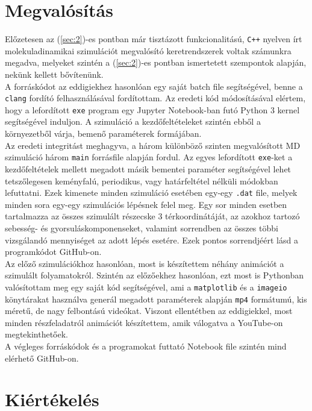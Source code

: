 \begin{multicols}{2}
\section{Megvalósítás} \label{sec:4}
Előzetesen az (\ref{sec:2})-es pontban már tisztázott funkcionalitású, \texttt{C++} nyelven írt molekuladinamikai szimulációt megvalósító keretrendszerek voltak számunkra megadva, melyeket szintén a (\ref{sec:2})-es pontban ismertetett szempontok alapján, nekünk kellett bővítenünk. \\
A forráskódot az eddigiekhez hasonlóan egy saját batch file segítségével, benne a \texttt{clang} fordító felhasználásával fordítottam. Az eredeti kód módosításával elértem, hogy a lefordított \texttt{exe} program egy Jupyter Notebook-ban futó Python 3 kernel segítségével induljon. A szimuláció a kezdőfeltételeket szintén ebből a környezetből várja, bemenő paraméterek formájában. \\
Az eredeti integritást meghagyva, a három különböző szinten megvalósított MD szimuláció három \texttt{main} forrásfile alapján fordul. Az egyes lefordított \texttt{exe}-ket a kezdőfeltételek mellett megadott másik bementei paraméter segítségével lehet tetszőlegesen keményfalú, periodikus, vagy határfeltétel nélküli módokban lefuttatni. Ezek kimenete minden szimuláció esetében egy-egy \texttt{.dat} file, melyek minden sora egy-egy szimulációs lépésnek felel meg. Egy sor minden esetben tartalmazza az összes szimulált részecske 3 térkoordinátáját, az azokhoz tartozó sebesség- és gyorsuláskomponenseket, valamint sorrendben az összes többi vizsgálandó mennyiséget az adott lépés esetére. Ezek pontos sorrendjéért lásd a programkódot GitHub-on\cite{github}. \\
Az előző szimulációkhoz hasonlóan, most is készítettem néhány animációt a szimulált folyamatokról. Szintén az előzőekhez hasonlóan, ezt most is Pythonban valósítottam meg egy saját kód segítségével, ami a \texttt{matplotlib} és a \texttt{imageio} könytárakat használva generál megadott paraméterek alapján \texttt{mp4} formátumú, kis méretű, de nagy felbontású videókat. Viszont ellentétben az eddigiekkel, most minden részfeladatról animációt készítettem, amik válogatva a YouTube-on megtekinthetőek\cite{yt}. \\
A végleges forráskódok és a programokat futtató Notebook file szintén mind elérhető GitHub-on\cite{github}.

\section{Kiértékelés} \label{sec:5}


\end{multicols}
